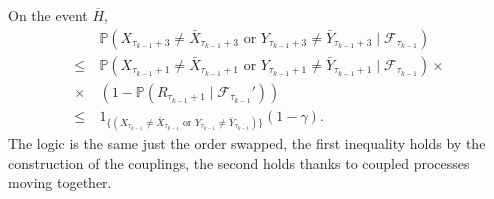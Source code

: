 \documentclass{article}
\begin{document}
On the event $\overline{H}$,
\begin{align}
 &\nonumber  \mathbb{P}(X_{\tau_{k-1}+3}\neq\bar{X}_{\tau_{k-1}+3}\mbox{ or }Y_{\tau_{k-1}+3}\neq\bar{Y}_{\tau_{k-1}+3}
\mid\mathcal{F}_{\tau_{k-1}})\\
\leq~&\nonumber \mathbb{P}(X_{\tau_{k-1}+1}\neq\bar{X}_{\tau_{k-1}+1}\mbox{ or }Y_{\tau_{k-1}+1}\neq\bar{Y}_{\tau_{k-1}+1}
\mid\mathcal{F}_{\tau_{k-1}})\times \\
\times~&\nonumber %
 (1-\mathbb{P}(R_{\tau_{k-1}+1}\mid\mathcal{F}_{\tau_{k-1}}'))\\
\leq~& \label{olt2} 1_{\{
(X_{\tau_{k-1}}\neq\bar{X}_{\tau_{k-1}}\mbox{ or }Y_{\tau_{k-1}}\neq \bar{Y}_{\tau_{k-1}})\}}
(1-\gamma).
\end{align}
The logic is the same just the order swapped, the first inequality holds by the construction of the couplings, the second holds thanks to coupled processes moving together.
\end{document}
